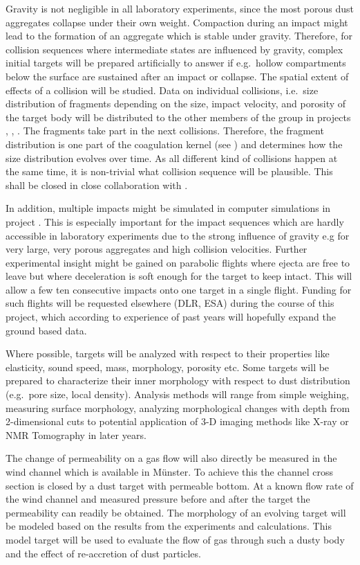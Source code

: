 Gravity is not negligible in all laboratory experiments, since the most
porous dust aggregates collapse under their own weight.  Compaction during
an impact might lead to the formation of an aggregate which is stable under
gravity.  Therefore, for collision sequences where intermediate states are
influenced by gravity, complex initial targets will be prepared artificially
to answer if e.g.\ hollow compartments below the surface are sustained after
an impact or collapse. The spatial extent of effects of a collision will be
studied. Data on individual collisions, i.e.\ size distribution of fragments
depending on the size, impact velocity, and porosity of the target body will
be distributed to the other members of the group in projects \projdul{},
\projkley{}, \projblum{}.  The fragments take part in the next
collisions. Therefore, the fragment distribution is one part of the
coagulation kernel (see \projdul{}) and determines how the size distribution
evolves over time. As all different kind of collisions happen at the same
time, it is non-trivial what collision sequence will be plausible. This
shall be closed in close collaboration with \projdul{}.

In addition, multiple impacts might be simulated in computer simulations in
project \projkley{}. This is especially important for the impact sequences
which are hardly accessible in laboratory experiments due to the strong
influence of gravity e.g for very large, very porous aggregates and high
collision velocities. Further experimental insight might be gained on
parabolic flights where ejecta are free to leave but where deceleration is
soft enough for the target to keep intact. This will allow a few ten
consecutive impacts onto one target in a single flight. Funding for such
flights will be requested elsewhere (DLR, ESA) during the course of this
project, which according to experience of past years will hopefully expand
the ground based data.

Where possible, targets will be analyzed with respect to their properties
like elasticity, sound speed, mass, morphology, porosity etc.  Some targets
will be prepared to characterize their inner morphology with respect to dust
distribution (e.g.\ pore size, local density). Analysis methods will range
from simple weighing, measuring surface morphology, analyzing morphological
changes with depth from 2-dimensional cuts to potential application of 3-D
imaging methods like X-ray or NMR Tomography in later years.

The change of permeability on a gas flow will also directly be measured in
the wind channel which is available in M\"unster.  To achieve this the
channel cross section is closed by a dust target with permeable bottom. At a
known flow rate of the wind channel and measured pressure before and after
the target the permeability can readily be obtained.  The morphology of an
evolving target will be modeled based on the results from the experiments
and calculations. This model target will be used to evaluate the flow of gas
through such a dusty body and the effect of re-accretion of dust particles.

